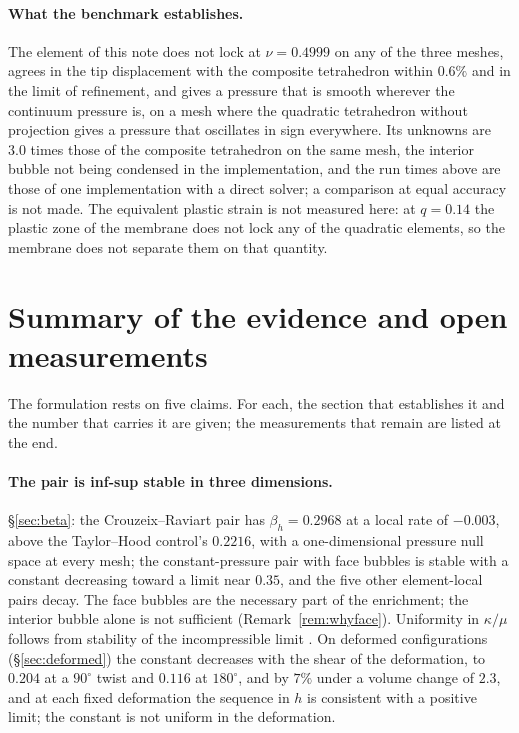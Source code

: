 \documentclass[11pt]{article}
\theoremstyle{definition}
\theoremstyle{plain}
\begin{document}
\paragraph{What the benchmark establishes.} The element of this note does
not lock at $\nu = 0.4999$ on any of the three meshes, agrees in the tip
displacement with the composite tetrahedron within $0.6\%$ and in the limit
of refinement, and gives a pressure that is smooth wherever the continuum
pressure is, on a mesh where the quadratic tetrahedron without projection
gives a pressure that oscillates in sign everywhere. Its unknowns are $3.0$
times those of the composite tetrahedron on the same mesh, the interior
bubble not being condensed in the implementation, and the run times above
are those of one implementation with a direct solver; a comparison at equal
accuracy is not made. The equivalent plastic strain is
not measured here: at $q = 0.14$ the plastic zone of the membrane does not
lock any of the quadratic elements, so the membrane does not separate them
on that quantity.

\section{Summary of the evidence and open measurements}
\label{sec:verify}

The formulation rests on five claims. For each, the section that establishes
it and the number that carries it are given; the measurements that remain are
listed at the end.

\paragraph{The pair is inf-sup stable in three dimensions.} \S\ref{sec:beta}:
the Crouzeix--Raviart pair has $\beta_h = 0.2968$ at a local rate of $-0.003$,
above the Taylor--Hood control's $0.2216$, with a one-dimensional pressure
null space at every mesh; the constant-pressure pair with face bubbles is
stable with a constant decreasing toward a limit near $0.35$, and the five
other element-local pairs decay. The face bubbles are the necessary part of
the enrichment; the interior bubble alone is
not sufficient (Remark~\ref{rem:whyface}). Uniformity in $\kappa/\mu$ follows
from stability of the incompressible limit
\citep[\S5.5.2, \S8.12.1, Remark~8.12.1]{BoffiBrezziFortin:2013}. On deformed
configurations (\S\ref{sec:deformed}) the constant decreases with the shear
of the deformation, to $0.204$ at a $90^\circ$ twist and $0.116$ at
$180^\circ$, and by $7\%$ under a volume change of $2.3$, and at each fixed
deformation the sequence in $h$ is consistent with a positive limit; the
constant is not uniform in the deformation.
\end{document}
